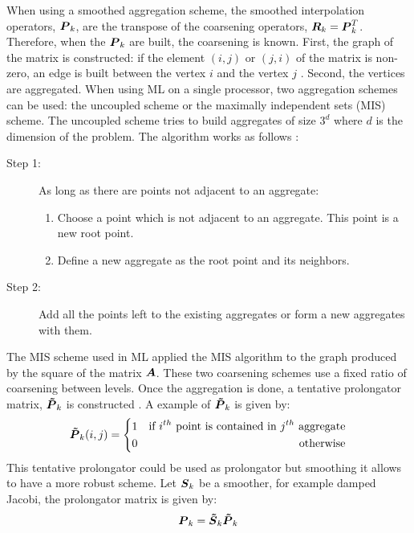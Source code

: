 When using a smoothed aggregation scheme, the smoothed interpolation operators,
$\boldsymbol{P}_k$, are the transpose of the coarsening operators,
$\boldsymbol{R}_k=\boldsymbol{P}_k^T$. Therefore, when the $\boldsymbol{P}_k$ are built, the
coarsening is known. First, the graph of the matrix is constructed: if the element
$(i,j)$ or $(j,i)$ of the matrix is non-zero, an edge is built between the
vertex $i$ and the vertex $j$ \cite{ml_guide}. Second, the vertices are
aggregated. When using ML on a single processor, two aggregation schemes can
be used: the uncoupled scheme or the maximally independent sets (MIS) scheme. 
The uncoupled scheme tries to build aggregates of size $3^d$ where $d$ is the
dimension of the problem. The algorithm works as follows \cite{mis}:
\begin{description}
  \item[Step 1:] As long as there are points not adjacent to an aggregate:
    \begin{enumerate}
      \item Choose a point which is not adjacent to an aggregate. This point
        is a new root point.
      \item Define a new aggregate as the root point and its neighbors.
    \end{enumerate}
  \item[Step 2:] Add all the points left to the existing aggregates or form a
    new aggregates with them.
\end{description}
The MIS scheme used in ML applied the MIS algorithm \cite{graph_coloring} to
the graph produced by the square of the matrix $\boldsymbol{A}$. These two coarsening 
schemes use a fixed ratio of coarsening between levels. Once the aggregation is 
done, a tentative prolongator matrix, $\boldsymbol{\tilde{P}}_k$ is constructed 
\cite{mis}. A example of $\boldsymbol{\tilde{P}}_k$ is given by:
\begin{equation}
  \boldsymbol{\tilde{P}}_k(i,j) = \left\{
  \begin{aligned}
    &1 &\textrm{if }i^{th}\textrm{ point is contained in }j^{th}\textrm{
    aggregate}\\
    & 0 &\textrm{otherwise}
  \end{aligned}
  \right.
\end{equation}
This tentative prolongator could be used as prolongator but smoothing it
allows to have a more robust scheme. Let $\boldsymbol{S}_k$ be a smoother, for example
damped Jacobi, the prolongator matrix is given by:
\begin{equation}
  \boldsymbol{P}_k = \boldsymbol{\tilde{S}}_k \boldsymbol{\tilde{P}}_k
\end{equation}

